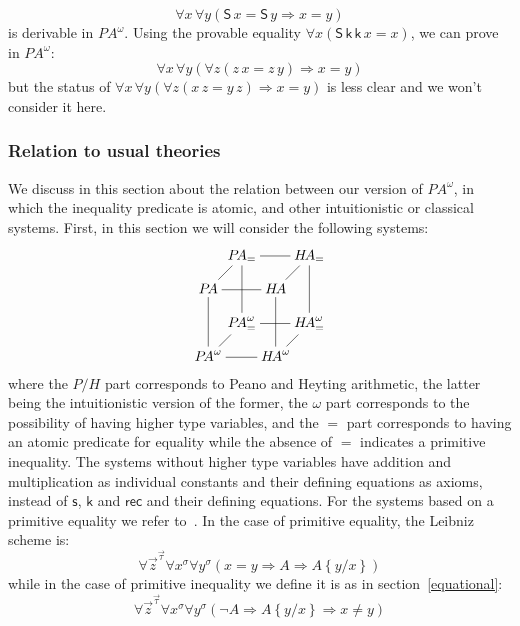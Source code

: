 \documentclass{CSML}
\newcommand*\SortA{\sigma}
\newcommand*\SortB{\tau}
\newcommand*\LogSortedTerm[2]{#1^{#2}}
\newcommand*\LogVarA{x}
\newcommand*\LogVarB{y}
\newcommand*\LogVarC{z}
\newcommand*\LogConst[1]{\mathsf{#1}}
\newcommand*\LogImp{\mathbin{\Rightarrow}}
\newcommand*\LogFormA{A}
\newcommand*\LogSubst[1]{\left\{#1\right\}}
\newcommand*\HA{{H\!A}}
\newcommand*\PA{{P\!A}}
\newcommand*\PAom{{\PA^\omega}}
\newcommand*\CALogs{\LogConst{s}}
\newcommand*\CALogk{\LogConst{k}}
\newcommand*\CALogS{\LogConst{S}}
\newcommand*\CALogrec{\LogConst{rec}}
\begin{document}
$$\forall\LogVarA\,\forall\LogVarB\left(\CALogS\,\LogVarA=\CALogS\,\LogVarB\LogImp\LogVarA=\LogVarB\right)$$
is derivable in $\PAom$. Using the provable equality $\forall\LogVarA\left(\CALogS\,\CALogk\,\CALogk\,\LogVarA=\LogVarA\right)$, we can prove in $\PAom$:
$$\forall\LogVarA\,\forall\LogVarB\left(\forall\LogVarC\left(\LogVarC\,\LogVarA=\LogVarC\,\LogVarB\right)\LogImp\LogVarA=\LogVarB\right)$$
but the status of $\forall\LogVarA\,\forall\LogVarB\left(\forall\LogVarC\left(\LogVarA\,\LogVarC=\LogVarB\,\LogVarC\right)\LogImp\LogVarA=\LogVarB\right)$ is less clear and we won't consider it here.
\subsubsection{Relation to usual theories}
\label{usualtheories}
We discuss in this section about the relation between our version of $\PAom$, in which the inequality predicate is atomic, and other intuitionistic or classical systems. First, in this section we will consider the following systems:
$$\xymatrix@!0{
&\PA_=\ar@{-}[rr]&&\HA_=\\
\PA\ar@{-}[ur]\ar@{-}[rr]&&\HA\ar@{-}[ur]\\
&\PA^\omega_=\ar@{-}[uu]\ar@{-}[rr]&&\HA^\omega_=\ar@{-}[uu]\\
\PA^\omega\ar@{-}[uu]\ar@{-}[ur]\ar@{-}[rr]&&\HA^\omega\ar@{-}[uu]\ar@{-}[ur]
}$$
where the $P/H$ part corresponds to Peano and Heyting arithmetic, the latter being the intuitionistic version of the former, the $\omega$ part corresponds to the possibility of having higher type variables, and the $=$ part corresponds to having an atomic predicate for equality while the absence of $=$ indicates a primitive inequality. The systems without higher type variables have addition and multiplication as individual constants and their defining equations as axioms, instead of $\CALogs$, $\CALogk$ and $\CALogrec$ and their defining equations. For the systems based on a primitive equality we refer to~\cite{TroelstraVanDalenConstructivism}. In the case of primitive equality, the Leibniz scheme is:
$$\forall\LogSortedTerm{\vec{\LogVarC}}{\vec{\SortB}}\forall\LogSortedTerm{\LogVarA}{\SortA}\forall\LogSortedTerm{\LogVarB}{\SortA}\left(\LogVarA=\LogVarB\LogImp\LogFormA\LogImp\LogFormA\LogSubst{\LogVarB/\LogVarA}\right)$$
while in the case of primitive inequality we define it is as in section~\ref{equational}:
$$\forall\LogSortedTerm{\vec{\LogVarC}}{\vec{\SortB}}\forall\LogSortedTerm{\LogVarA}{\SortA}\forall\LogSortedTerm{\LogVarB}{\SortA}\left(\neg\LogFormA\LogImp\LogFormA\LogSubst{\LogVarB/\LogVarA}\LogImp\LogVarA\neq\LogVarB\right)$$
\end{document}
